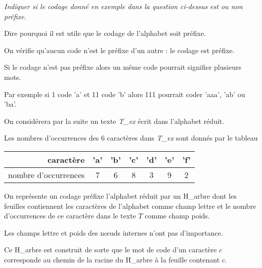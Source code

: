 \begin{Exercise}\it
Indiquer si le codage donné en exemple dans la question ci-dessus est ou non
préfixe. 

Dire pourquoi il est utile que le codage de l’alphabet soit préfixe.
\end{Exercise}
\begin{Answer}

On vérifie qu'aucun code n'est le préfixe d'un autre : le codage est préfixe.

\medskip

Si le codage n'est pas préfixe alors un même code pourrait signifier plusieurs mots.

Par exemple si 1 code 'a' et 11 code 'b' alors 111 pourrait coder 'aaa', 'ab' ou 'ba'.
\end{Answer}
\medskip

On considérera par la suite un texte {\it T\_ex} écrit dans l'alphabet réduit.

Les nombres d'occurrences des 6 caractères dans {\it T\_ex} sont donnés par le tableau
\begin{center}
    \begin{tabular}{r|cccccc}
      caractère & 'a'&'b'&'c'&'d'&'e'&'f'\\
      \hline
       nombre d'occurrences & 7&6&8&3&9&2\\
    \end{tabular}
  \end{center}

On représente un codage préfixe l'alphabet réduit par un H\_arbre dont les feuilles contiennent les caractères de l’alphabet comme champ lettre et le nombre d’occurrences de ce caractère dans le texte $T$ comme champ poids.

Les champs lettre et poids des nœuds internes n’ont pas d’importance. 

Ce H\_arbre est construit de sorte que le mot de code d’un caractère $c$ corresponde au chemin de la racine du H\_arbre à la feuille contenant $c$. 

